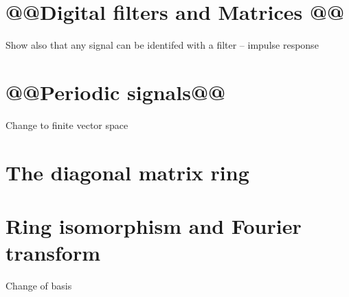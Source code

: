 \section{@@Digital filters and Matrices @@}
Show also that any signal can be identifed with a filter -- impulse response
\section{@@Periodic signals@@}
Change to finite vector space
\section{The diagonal matrix ring}
\section{Ring isomorphism and Fourier transform}
Change of basis